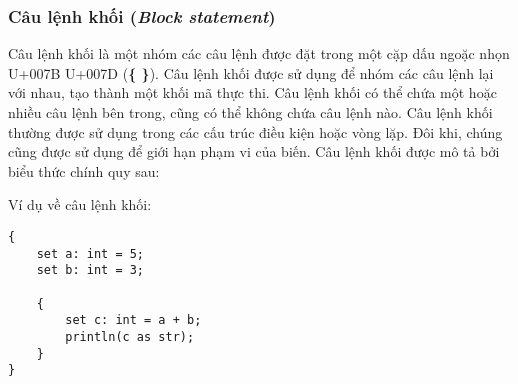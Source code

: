 \subsubsection{Câu lệnh khối (\textit{Block statement})}

Câu lệnh khối là một nhóm các câu lệnh được đặt trong một cặp dấu ngoặc nhọn U+007B U+007D (\textbf{\{ \}}). Câu lệnh khối được sử dụng để nhóm các câu lệnh lại với nhau, tạo thành một khối mã thực thi. Câu lệnh khối có thể chứa một hoặc nhiều câu lệnh bên trong, cũng có thể không chứa câu lệnh nào. Câu lệnh khối thường được sử dụng trong các cấu trúc điều kiện hoặc vòng lặp. Đôi khi, chúng cũng được sử dụng để giới hạn phạm vi của biến. Câu lệnh khối được mô tả bởi biểu thức chính quy sau:

\regexblockstmt

\noindent Ví dụ về câu lệnh khối:
\begin{lstlisting}[]
{
    set a: int = 5;
    set b: int = 3;

    {
        set c: int = a + b;
        println(c as str);
    }
}
\end{lstlisting}
